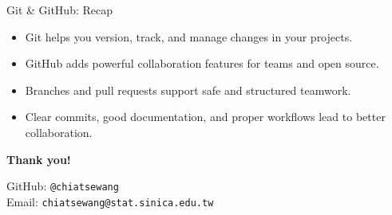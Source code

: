 \documentclass[12pt]{beamer}
\begin{document}
\begin{frame}{Git \& GitHub: Recap}
  \begin{itemize}
    \setlength\itemsep{1em}
    \item Git helps you version, track, and manage changes in your projects.
    \item GitHub adds powerful collaboration features for teams and open source.
    \item Branches and pull requests support safe and structured teamwork.
    \item Clear commits, good documentation, and proper workflows lead to better collaboration.
  \end{itemize}
\end{frame}

\begin{frame}
  \vfill
  \centering
  {\LARGE \textbf{Thank you!}} \par
  \vfill

  \begin{minipage}{0.7\linewidth}
    \raggedright
    \small
    GitHub: \texttt{@chiatsewang} \\
    Email: \texttt{chiatsewang@stat.sinica.edu.tw}
  \end{minipage}
\end{frame}
\end{document}
